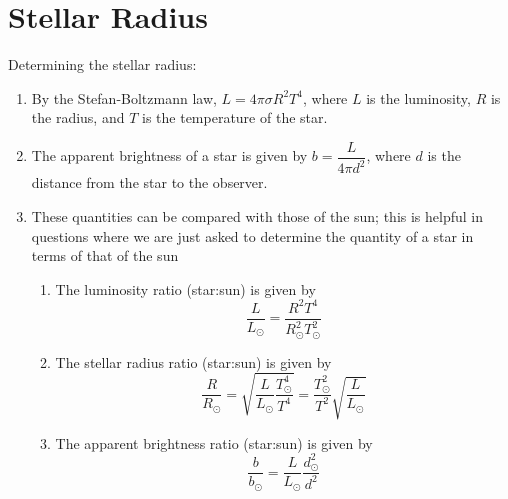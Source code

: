 \documentclass[a4paper,12pt]{article}
\let\oldsection\section
\renewcommand\section{\clearpage\oldsection}
\begin{document}
\section{Stellar Radius}

Determining the stellar radius:
\begin{enumerate}
  \item By the Stefan-Boltzmann law, $L = 4\pi\sigma R^2T^4$, where $L$ is the luminosity, $R$ is the radius, and $T$ is the temperature of the star.
  \item The apparent brightness of a star is given by $b = \dfrac{L}{4\pi d^2}$, where $d$ is the distance from the star to the observer.
  \item These quantities can be compared with those of the sun; this is helpful in questions where we are just asked to determine the quantity of a star in terms of that of the sun
        \begin{enumerate}
          \item The luminosity ratio (star:sun) is given by
                $$\frac{L}{L_{\odot}} = \frac{R^2T^4}{R^2_{\odot}T^2_{\odot}}$$
          \item The stellar radius ratio (star:sun) is given by
                $$\frac{R}{R_{\odot}} = \sqrt{\frac{L}{L_{\odot}}\frac{T_{\odot}^4}{T^4}} = \frac{T_{\odot}^2}{T^2}\sqrt{\frac{L}{L_{\odot}}}$$
          \item The apparent brightness ratio (star:sun) is given by
                $$\frac{b}{b_{\odot}} = \frac{L}{L_{\odot}}\frac{d_{\odot}^2}{d^2}$$
        \end{enumerate}
\end{enumerate}
\end{document}
